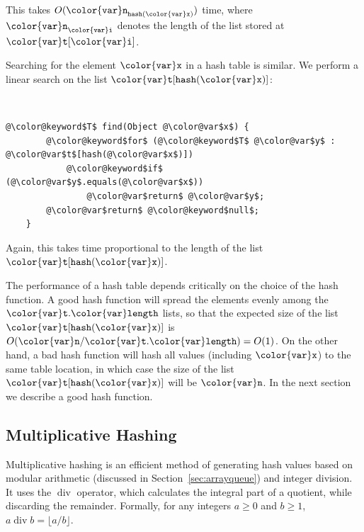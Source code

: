 \documentclass[10pt]{book}
\newcommand{\seclabel}[1]{\label{sec:#1}}
\newcommand{\secref}[1]{Section~\ref{sec:#1}}
\theoremstyle{plain}
\theoremstyle{definition}
\DeclareMathOperator{\ddiv}{div}
\begin{document}
This takes $O(\ensuremath{\mathtt{{\color{var}n}}}_{\ensuremath{\mathtt{hash({\color{var}x})}}})$ time, where $\ensuremath{\mathtt{{\color{var}n}}}_{\ensuremath{\mathtt{{\color{var}i}}}}$ denotes the length
of the list stored at \ensuremath{\mathtt{{\color{var}t}[{\color{var}i}]}}.

Searching for the element \ensuremath{\mathtt{{\color{var}x}}} in a hash table is similar.  We perform
a linear search on the list \ensuremath{\mathtt{{\color{var}t}[hash({\color{var}x})]}}:


 \ \vspace{.5ex}\begin{Verbatim}[gobble=1,tabsize=2,frame=single,framerule=1.2pt,commandchars=\\@\$,label=\texttt{ChainedHashTable},labelposition=topline]
	@\color@keyword$T$ find(Object @\color@var$x$) {
		@\color@keyword$for$ (@\color@keyword$T$ @\color@var$y$ : @\color@var$t$[hash(@\color@var$x$)])
			@\color@keyword$if$ (@\color@var$y$.equals(@\color@var$x$))
				@\color@var$return$ @\color@var$y$;
		@\color@var$return$ @\color@keyword$null$;
	}
\end{Verbatim}

Again, this takes time proportional to the length of the list \ensuremath{\mathtt{{\color{var}t}[hash({\color{var}x})]}}.

The performance of a hash table depends critically on the choice of the
hash function.  A good hash function will spread the elements evenly
among the \ensuremath{\mathtt{{\color{var}t}.{\color{var}length}}} lists, so that the expected size of the list
\ensuremath{\mathtt{{\color{var}t}[hash({\color{var}x})]}} is $O(\ensuremath{\mathtt{{\color{var}n}}}/\ensuremath{\mathtt{{\color{var}t}.{\color{var}length})}} = O(1)$.  On the other hand, a bad
hash function will hash all values (including \ensuremath{\mathtt{{\color{var}x}}}) to the same table
location, in which case the size of the list \ensuremath{\mathtt{{\color{var}t}[hash({\color{var}x})]}} will be \ensuremath{\mathtt{{\color{var}n}}}.
In the next section we describe a good hash function.

\subsection{Multiplicative Hashing}
\seclabel{multihash}

%
%
Multiplicative hashing is an efficient method of generating hash
values based on modular arithmetic (discussed in \secref{arrayqueue})
and integer division.  It uses the $\ddiv$ operator, which calculates
the integral part of a quotient, while discarding the remainder.
Formally, for any integers $a\ge 0$ and $b\ge 1$, $a\ddiv b = \lfloor
a/b\rfloor$.
\end{document}
